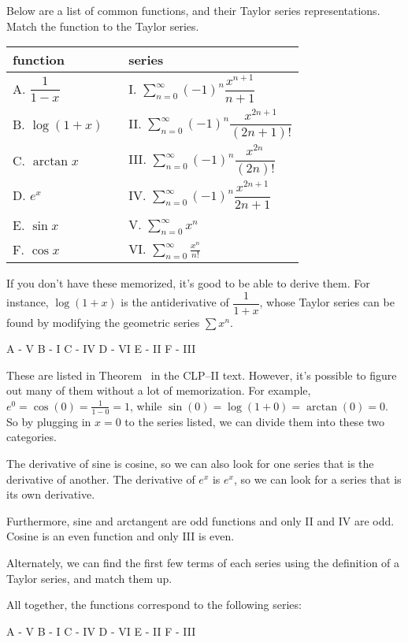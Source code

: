 \begin{Mquestion}
Below are a list of common functions, and their Taylor series representations. Match the function to the Taylor series.
\begin{center}
\begin{tabular}{l c l}
function & \qquad & series\\
\hline
A. $\dfrac{1}{1-x}$&&I. $\displaystyle\sum_{n=0}^\infty(-1)^n\dfrac{x^{n+1}}{n+1}$\\[20pt]
B. $\log(1+x)$&&II. $\displaystyle\sum_{n=0}^\infty(-1)^n\dfrac{x^{2n+1}}{(2n+1)!}$\\[20pt]
C. $\arctan x$&&III. $\displaystyle\sum_{n=0}^\infty(-1)^n\dfrac{x^{2n}}{(2n)!}$\\[20pt]
D. $e^x$&&IV. $\displaystyle\sum_{n=0}^\infty(-1)^n\dfrac{x^{2n+1}}{2n+1}$\\[20pt]
E. $\sin x$ &&V. $\displaystyle\sum_{n=0}^\infty x^n$\\[20pt]
F. $\cos x$ &&VI. $\displaystyle\sum_{n=0}^\infty \frac{x^n}{n!}$
\end{tabular}
\end{center}
\end{Mquestion}
\begin{hint}
If you don't have these memorized, it's good to be able to derive them. For instance, $\log(1+x)$ is the antiderivative of $\dfrac{1}{1+x}$, whose Taylor series can be found by modifying the geometric series $\sum x^n$.
\end{hint}
\begin{answer}
A - V \hfill
B - I \hfill
C - IV \hfill
D - VI \hfill
E - II \hfill
F - III
\end{answer}
\begin{solution}
These are listed in Theorem~ in the CLP--II text. However, it's possible to figure out many of them without a lot of memorization. For example, $e^0=\cos(0)=\frac{1}{1-0}=1$, while $\sin(0)=\log(1+0)=\arctan(0)=0$. So by plugging in $x=0$ to the series listed, we can divide them into these two categories.

The derivative of sine is cosine, so we can also look for one series that is the derivative of another. The derivative of $e^x$ is $e^x$, so we can look for a series that is its own derivative.

Furthermore,      sine and arctangent are odd functions and only  II and IV are  odd.
Cosine is an even  function and only III is even.

Alternately, we can find the first few terms of each series using the definition of a Taylor series, and match them up.

All together, the functions correspond to the following series:

A - V \hfill
B - I \hfill
C - IV \hfill
D - VI \hfill
E - II \hfill
F - III

\end{solution}
